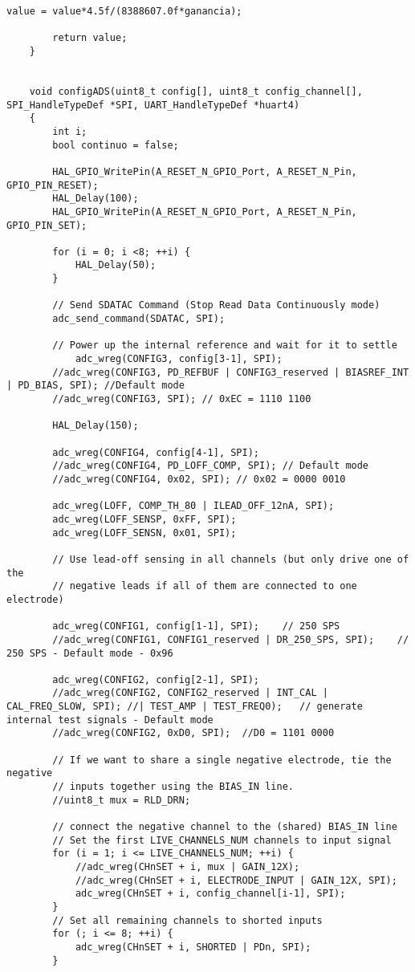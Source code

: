 \begin{lstlisting}[label=algoritmo:STM32F4:ADS1299.c,style = STM-code,frame=single,caption=STM32F4:ADS1299.c]
		value = value*4.5f/(8388607.0f*ganancia);
		
		return value;
	}
	
	
	void configADS(uint8_t config[], uint8_t config_channel[], SPI_HandleTypeDef *SPI, UART_HandleTypeDef *huart4)
	{
		int i;
		bool continuo = false;

		HAL_GPIO_WritePin(A_RESET_N_GPIO_Port, A_RESET_N_Pin, GPIO_PIN_RESET);
		HAL_Delay(100);
		HAL_GPIO_WritePin(A_RESET_N_GPIO_Port, A_RESET_N_Pin, GPIO_PIN_SET);
		
		for (i = 0; i <8; ++i) {    
			HAL_Delay(50);
		}

		// Send SDATAC Command (Stop Read Data Continuously mode)
		adc_send_command(SDATAC, SPI);

		// Power up the internal reference and wait for it to settle
			adc_wreg(CONFIG3, config[3-1], SPI);
		//adc_wreg(CONFIG3, PD_REFBUF | CONFIG3_reserved | BIASREF_INT | PD_BIAS, SPI); //Default mode
		//adc_wreg(CONFIG3, SPI); // 0xEC = 1110 1100	
		
		HAL_Delay(150);
		
		adc_wreg(CONFIG4, config[4-1], SPI);
		//adc_wreg(CONFIG4, PD_LOFF_COMP, SPI); // Default mode
		//adc_wreg(CONFIG4, 0x02, SPI); // 0x02 = 0000 0010
		
		adc_wreg(LOFF, COMP_TH_80 | ILEAD_OFF_12nA, SPI);
		adc_wreg(LOFF_SENSP, 0xFF, SPI);
		adc_wreg(LOFF_SENSN, 0x01, SPI);
		
		// Use lead-off sensing in all channels (but only drive one of the
		// negative leads if all of them are connected to one electrode)
		
		adc_wreg(CONFIG1, config[1-1], SPI);	// 250 SPS
		//adc_wreg(CONFIG1, CONFIG1_reserved | DR_250_SPS, SPI);	// 250 SPS - Default mode - 0x96
		
		adc_wreg(CONFIG2, config[2-1], SPI);
		//adc_wreg(CONFIG2, CONFIG2_reserved | INT_CAL | CAL_FREQ_SLOW, SPI); //| TEST_AMP | TEST_FREQ0);	// generate internal test signals - Default mode
		//adc_wreg(CONFIG2, 0xD0, SPI);  //D0 = 1101 0000
		
		// If we want to share a single negative electrode, tie the negative
		// inputs together using the BIAS_IN line.
		//uint8_t mux = RLD_DRN;

		// connect the negative channel to the (shared) BIAS_IN line
		// Set the first LIVE_CHANNELS_NUM channels to input signal
		for (i = 1; i <= LIVE_CHANNELS_NUM; ++i) {
			//adc_wreg(CHnSET + i, mux | GAIN_12X);
			//adc_wreg(CHnSET + i, ELECTRODE_INPUT | GAIN_12X, SPI); 
			adc_wreg(CHnSET + i, config_channel[i-1], SPI);
		}
		// Set all remaining channels to shorted inputs
		for (; i <= 8; ++i) {
			adc_wreg(CHnSET + i, SHORTED | PDn, SPI);
		}
		

\end{lstlisting}
